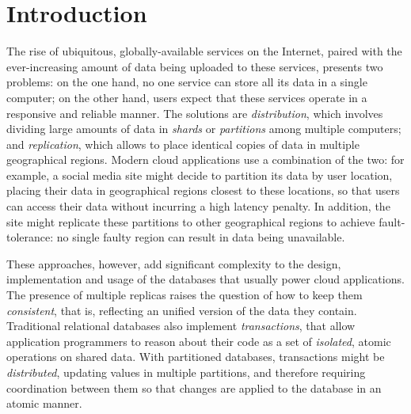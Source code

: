 \cleardoublepage
\chapter{Introduction}


The rise of ubiquitous, globally-available services on the Internet, paired with the ever-increasing amount of data being uploaded to these services, presents two problems: on the one hand, no one service can store all its data in a single computer; on the other hand, users expect that these services operate in a responsive and reliable manner. The solutions are \emph{distribution}, which involves dividing large amounts of data in \emph{shards} or \emph{partitions} among multiple computers; and \emph{replication}, which allows to place identical copies of data in multiple geographical regions. Modern cloud applications use a combination of the two: for example, a social media site might decide to partition its data by user location, placing their data in geographical regions closest to these locations, so that users can access their data without incurring a high latency penalty. In addition, the site might replicate these partitions to other geographical regions to achieve fault-tolerance: no single faulty region can result in data being unavailable.

These approaches, however, add significant complexity to the design, implementation and usage of the databases that usually power cloud applications. The presence of multiple replicas raises the question of how to keep them \emph{consistent}, that is, reflecting an unified version of the data they contain. Traditional relational databases also implement \emph{transactions}, that allow application programmers to reason about their code as a set of \emph{isolated}, atomic operations on shared data. With partitioned databases, transactions might be \emph{distributed}, updating values in multiple partitions, and therefore requiring coordination between them so that changes are applied to the database in an atomic manner.

